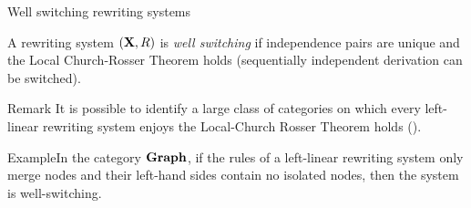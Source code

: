 \documentclass[usenames,dvipsnames]{beamer}
\newcommand{\shift}[1]{\ensuremath{\mathrel{{\leftrightsquigarrow}_{#1}}}}
\newcommand{\dder}[1]{\mathscr{#1}}
\newcommand{\catname}[1]{{\normalfont\textbf{#1}}}
\def\X{\textbf {\textup{X}}}
\begin{document}
\begin{frame}{Well switching rewriting systems}\justifying


\begin{definition}
A rewriting system $(\X, R)$ is \emph{well switching} if independence pairs are unique and the Local Church-Rosser Theorem holds (sequentially independent derivation can be switched).
\end{definition}
\pause 
\begin{block}{Remark}
	It is possible to identify a large class of categories on which every left-linear rewriting system enjoys the Local-Church Rosser Theorem holds (\cite{baldan2011adhesivity}).
\end{block}
\pause 
\begin{block}{Example}In the category $\catname{Graph}$, if the rules of a left-linear rewriting system only merge nodes and their left-hand sides contain no isolated nodes, then the system is well-switching.
\end{block}

\end{frame}
\iffalse 
\begin{frame}{Results: the Three Steps Lemma}\justifying

\begin{lemma}  Let
	$\dder{D}_0\cdot \dder{D}_1 \cdot \dder{D}_2$ be a three-steps
	derivation in a well-switching rewriting system. 
	\begin{enumerate}\justifying
		\item
		If $\dder{D}_0$ and $\dder{D}_1$ are independent and there is a
		 sequence of switches
		$\dder{D}_0\cdot \dder{D}_1 \cdot \dder{D}_2 \shift{(1,2)}
		\dder{D}_0 \cdot \dder{D}_2' \cdot \dder{D}_1' \shift{(0,1)}
		\dder{D}_2'' \cdot \dder{D}_0' \cdot \dder{D}_1'$ then
		in the last derivation $\dder{D}_0'$ and $\dder{D}_1'$ are independent;
		
		\item
		\label{lem:indep-global-left:2}
		Suppose that $\dder{D}_1$ and $\dder{D}_2$ are independent, and that, in $\dder{D}_0\cdot \dder{D}_1 \cdot \dder{D}_2 \shift{(1,2)}
		\dder{D}_0 \cdot \dder{D}_2' \cdot \dder{D}_1'$, $\dder{D}_0$ and $\dder{D}_2'$ are independent.  If there
		is a switching sequence
		$\dder{D}_0\cdot \dder{D}_1 \cdot \dder{D}_2 \shift{(0,1)}
		\dder{D}_1' \cdot \dder{D}_0' \cdot \dder{D}_2 \shift{(1,2)}
		\dder{D}_1' \cdot \dder{D}_2' \cdot \dder{D}_0''$ then in the last derivation $\dder{D}_1'$ and $\dder{D}_2'$ are independent.
	\end{enumerate}
\end{lemma}
\end{frame}
\fi 
\end{document}
